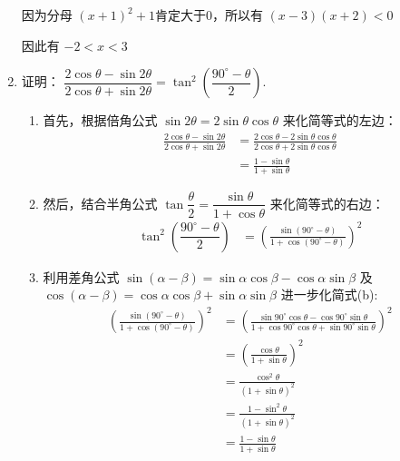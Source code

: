\documentclass[answers]{exam}
\begin{document}
\begin{questions}
\begin{enumerate}[label=(\arabic*)]
\begin{solution}
			      因为分母 \( (x+1)^2 + 1  \)肯定大于0，所以有 \( (x-3)(x+2) < 0 \)

			      因此有 \( -2 < x < 3 \)
		      \end{solution}

		\item 证明： \( \dfrac{2\cos\theta - \sin2\theta}{2\cos\theta + \sin2\theta} = \tan^2\left(\dfrac{90^\circ -
			      \theta}{2}\right) \).
		      \begin{solution}
			      \begin{enumerate}[label=\arabic*. ]
				      \item 首先，根据倍角公式 \( \sin2\theta = 2\sin\theta\cos\theta \) 来化简等式的左边：
				            \begin{align*}
					            \frac{2\cos\theta - \sin2\theta}{2\cos\theta + \sin2\theta}
					             & = \frac{2\cos\theta - 2\sin\theta\cos\theta}{2\cos\theta + 2\sin\theta\cos\theta} \\
					             & = \frac{1-\sin\theta}{1+\sin\theta} \tag{a}
				            \end{align*}
				      \item 然后，结合半角公式 \( \tan\dfrac{\theta}{2} = \dfrac{\sin\theta}{1+\cos\theta} \)
				            来化简等式的右边：
				            \begin{align*}
					            \tan^2\left(\dfrac{90^\circ - \theta}{2}\right)
					             & = \left(\frac{\sin(90^\circ-\theta)}{1+\cos(90^\circ-\theta)}\right)^2 \tag{b}
				            \end{align*}
				      \item 利用差角公式 \( \sin(\alpha-\beta) = \sin\alpha\cos\beta - \cos\alpha\sin\beta \) 及 \(
				            \cos(\alpha - \beta) = \cos\alpha\cos\beta + \sin\alpha\sin\beta \) 进一步化简式(b):
				            \begin{align*}
					            \left(\frac{\sin(90^\circ-\theta)}{1+\cos(90^\circ-\theta)}\right)^2
					             & = \left(\frac{\sin90^\circ\cos\theta -
						            \cos90^\circ\sin\theta}{1+\cos90^\circ\cos\theta + \sin90^\circ\sin\theta}\right)^2
					            \\
					             & = \left(\frac{\cos\theta}{1+\sin\theta}\right)^2 \\
					             & = \frac{\cos^2\theta}{(1+\sin\theta)^2}          \\
					             & = \frac{1-\sin^2\theta}{(1+\sin\theta)^2}        \\
					             & = \frac{1-\sin\theta}{1+\sin\theta} \tag{c}

\end{align*}
\end{enumerate}
\end{solution}
\end{enumerate}
\end{questions}
\end{document}

